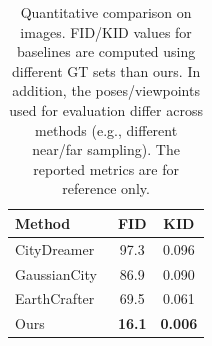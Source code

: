 \begin{table}[h]
\caption{Quantitative comparison on images. FID/KID values for baselines are computed using different GT sets than ours. In addition, the poses/viewpoints used for evaluation differ across methods (e.g., different near/far sampling). The reported metrics are for reference only.}
\centering
\small
\setlength{\tabcolsep}{10pt}
\begin{tabular}{lcc}
\toprule
\textbf{Method} & \textbf{FID} & \textbf{KID} \\
\midrule
CityDreamer~\cite{CityDreamer} & 97.3 & 0.096 \\
GaussianCity~\cite{Xie_2025_CVPR} & 86.9 & 0.090 \\
EarthCrafter~\cite{earthcrafter} & 69.5 & 0.061 \\
\hline
Ours &\textbf{16.1}&\textbf{0.006}\\
\bottomrule
\end{tabular}
\label{tab:conditions_results}
\end{table}
